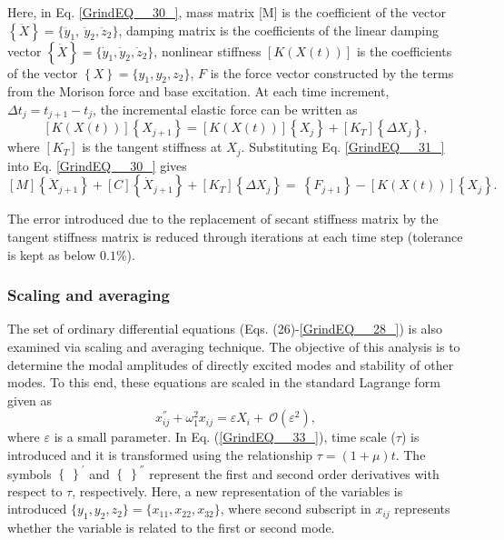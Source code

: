 \documentclass[review]{elsarticle}
\begin{document}
Here, in Eq. \eqref{GrindEQ__30_}, mass matrix [M] is the coefficient of  the vector $\left\{\ddot{X}\right\}=\{{\ddot{y}}_1,\ {\ddot{y}}_2,{\ddot{z}}_2\}$, damping matrix is the coefficients of the linear damping vector $\left\{\dot{X}\right\}=\{{\dot{y}}_1,{\dot{y}}_2,{\dot{z}}_2\}$, nonlinear stiffness $\left[K(X\left(t\right))\right]$ is the coefficients of the vector $\left\{X\right\}=\{y_1,y_2,z_2\}$, $F$ is the force vector constructed by the terms from the Morison force and base excitation. At each time increment, $\Delta t_j=t_{j+1}-t_j$, the incremental elastic force can be written as
\begin{equation} \label{GrindEQ__31_} 
\left[K(X\left(t\right))\right]\left\{X_{j+1}\right\}=\left[K(X\left(t\right))\right]\left\{X_j\right\}+[K_T]\left\{\Delta X_j\right\},       
\end{equation} 
where $[K_T]$ is the tangent stiffness at $X_j$. Substituting Eq. \eqref{GrindEQ__31_} into Eq. \eqref{GrindEQ__30_} gives
\begin{equation} \label{GrindEQ__32_} 
\left[M\right]\left\{{\ddot{X}}_{j+1}\right\}+\left[C\right]\left\{{\dot{X}}_{j+1}\right\}+\left[K_T\right]\left\{\Delta X_j\right\}=\ \left\{F_{j+1}\right\}-\left[K(X\left(t\right))\right]\left\{X_j\right\}. 
\end{equation} 

The error introduced due to the replacement of secant stiffness matrix by the tangent stiffness matrix is reduced through iterations at each time step (tolerance is kept as below $0.1$\%).
\subsubsection{Scaling and averaging}
The set of ordinary differential equations (Eqs. (26)-\eqref{GrindEQ__28_}) is also examined via scaling and averaging technique. The objective of this analysis is to determine the modal amplitudes of directly excited modes and stability of other modes.  To this end, these equations are scaled in the standard Lagrange form given as
\begin{equation} \label{GrindEQ__33_} 
x^{''}_{ij}+{\omega }^2_1x_{ij}=\varepsilon X_i+\ \mathcal{O}({\varepsilon }^2),            
\end{equation} 
where $\varepsilon$ is a small parameter. In Eq. (\ref{GrindEQ__33_}), time scale ($\tau$) is introduced and it is transformed using the relationship $\tau=(1+\mu)t$. The symbols ${\left\{\ \right\}}^{'}$ and ${\left\{\ \right\}}^{''}$ represent the first and second order derivatives with respect to $\tau$, respectively. Here, a new representation of the variables is introduced  $\{y_1, y_2, z_2\}=\{x_{11}, x_{22}, x_{32}\}$, where second subscript in $x_{ij}$ represents whether the variable is related to the first or second mode.
\end{document}
